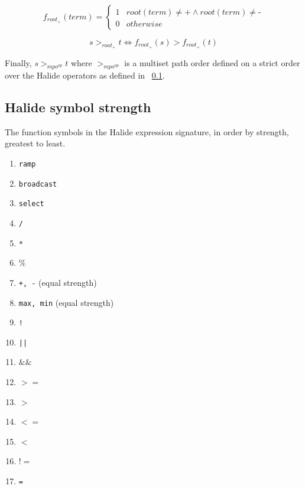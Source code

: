\documentclass[sigplan,10pt,review,anonymous]{acmart}\settopmatter{printfolios=true,printccs=false,printacmref=false}
\begin{document}
\[
f_{root_{\texttt{+}}}(term) = \begin{cases}
                          1 & root(term) \neq \texttt{+} \wedge root(term) \neq \texttt{-} \\
                          0 & otherwise
                          \end{cases}
\]

\begin{equation}
s >_{root_{\texttt{+}}} t \iff f_{root_{\texttt{+}}}(s) > f_{root_{\texttt{+}}}(t)
\end{equation}

Finally, $s >_{mpo^{op}} t$ where $>_{mpo^{op}}$ is a multiset path order defined on a strict order over the Halide operators as defined in ~\ref{symbolstrength}.

\subsection{Halide symbol strength} \label{symbolstrength}

The function symbols in the Halide expression signature, in order by strength, greatest to least.

\begin{enumerate}
  \item \texttt{ramp}
  \item \texttt{broadcast}
  \item \texttt{select}
  \item \texttt{/}
  \item \texttt{*}
  \item \texttt{$\%$}
  \item \texttt{+, -} (equal strength)
  \item \texttt{max, min} (equal strength)
  \item \texttt{!}
  \item \texttt{||}
  \item \texttt{$\&\&$}
  \item \texttt{$>=$}
  \item \texttt{$>$}
  \item \texttt{$<=$}
  \item \texttt{$<$}
  \item \texttt{$!=$}
  \item \texttt{=}
\end{enumerate}
\end{document}
